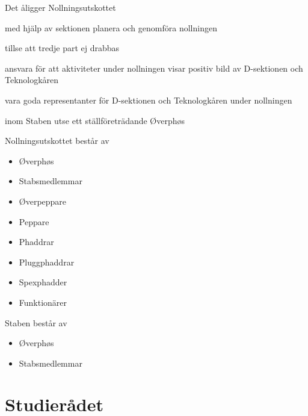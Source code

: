 \documentclass[pdfbookmarks,a4paper,11pt]{article}
\newlength{\itemcollength}
\newenvironment{reglemlista}{%
  \begin{list}{}{%
      \setlength{\labelwidth}{\itemcollength}%
      \setlength{\leftmargin}{\labelwidth + \labelsep}%
      \renewcommand{\makelabel}[1]{%
        \raisebox{0pt}[1ex][0pt]{%
          \makebox[\labelwidth][l]{%
            \parbox[t]{\itemcollength}{%
              \raggedright\hspace{0pt}##1}}}\hfill}%
      }}{%
  \end{list}}
\begin{document}
\begin{reglemlista}

	\item[Åligganden]
	Det åligger Nollningsutskottet
	\begin{attlista}
		\item med hjälp av sektionen planera och genomföra nollningen
		\item tillse att tredje part ej drabbas
		\item ansvara för att aktiviteter under nollningen visar positiv bild av D-sektionen och Teknologkåren
		\item vara goda representanter för D-sektionen och Teknologkåren under nollningen
		\item inom Staben utse ett ställföreträdande Øverphøs
	\end{attlista}

	\item[Sammansättning]
	Nollningsutskottet består av
	\begin{itemize}
		\item Øverphøs
		\item Stabsmedlemmar
		\item \O verpeppare
		\item Peppare
		\item Phaddrar
		\item Pluggphaddrar
		\item Spexphadder
        \item Funktionärer
	\end{itemize}

	\item[Staben]
	Staben består av
	\begin{itemize}
		\item Øverphøs
		\item Stabsmedlemmar
	\end{itemize}

\end{reglemlista}

\section{Studierådet}
\end{document}

